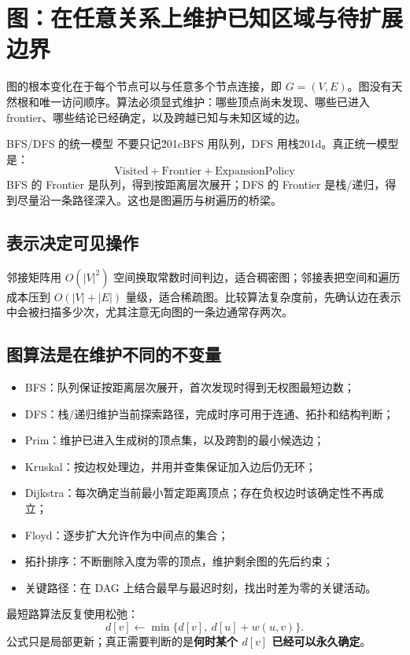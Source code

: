 \documentclass[11pt,a4paper,openany]{ctexbook}
\newcommand{\key}[1]{\textbf{\color{deep}#1}}
\begin{document}
\section{图：在任意关系上维护已知区域与待扩展边界}
图的根本变化在于每个节点可以与任意多个节点连接，即 $G=(V,E)$。图没有天然根和唯一访问顺序。算法必须显式维护：哪些顶点尚未发现、哪些已进入 frontier、哪些结论已经确定，以及跨越已知与未知区域的边。

\begin{corebox}{BFS/DFS 的统一模型}
不要只记\u201cBFS 用队列，DFS 用栈\u201d。真正统一模型是：
\[
\boxed{\text{Visited}+\text{Frontier}+\text{ExpansionPolicy}}
\]
BFS 的 Frontier 是队列，得到按距离层次展开；DFS 的 Frontier 是栈/递归，得到尽量沿一条路径深入。这也是图遍历与树遍历的桥梁。
\end{corebox}

\subsection{表示决定可见操作}
邻接矩阵用 $O(|V|^2)$ 空间换取常数时间判边，适合稠密图；邻接表把空间和遍历成本压到 $O(|V|+|E|)$ 量级，适合稀疏图。比较算法复杂度前，先确认边在表示中会被扫描多少次，尤其注意无向图的一条边通常存两次。

\subsection{图算法是在维护不同的不变量}
\begin{itemize}
  \item BFS：队列保证按距离层次展开，首次发现时得到无权图最短边数；
  \item DFS：栈/递归维护当前探索路径，完成时序可用于连通、拓扑和结构判断；
  \item Prim：维护已进入生成树的顶点集，以及跨割的最小候选边；
  \item Kruskal：按边权处理边，并用并查集保证加入边后仍无环；
  \item Dijkstra：每次确定当前最小暂定距离顶点；存在负权边时该确定性不再成立；
  \item Floyd：逐步扩大允许作为中间点的集合；
  \item 拓扑排序：不断删除入度为零的顶点，维护剩余图的先后约束；
  \item 关键路径：在 DAG 上结合最早与最迟时刻，找出时差为零的关键活动。
\end{itemize}

最短路算法反复使用松弛：
\[
d[v]\leftarrow\min\{d[v],\ d[u]+w(u,v)\}.
\]
公式只是局部更新；真正需要判断的是\key{何时某个 $d[v]$ 已经可以永久确定}。
\end{document}

